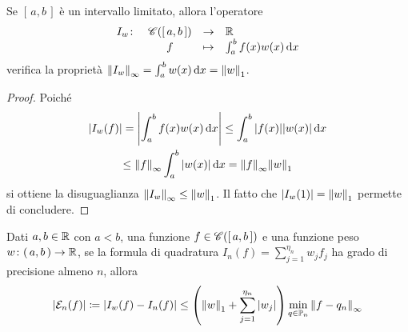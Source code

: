 	\begin{proposizione}\label{prop:norma-integrale}
		Se \([\, a, b \,]\) è un intervallo limitato, allora l'operatore
		\begin{equation*}
			\begin{array}{rccl}
				I_w \colon & \mathscr{C} ([\, a, b \,]) & \to & \mathbb{R} \\
				& f & \mapsto & \int_a^b f (x) w(x) \dd{x}
			\end{array}
		\end{equation*}
		verifica la proprietà \(\norm{I_w}_\infty = \int_a^b w (x) \dd{x} = \norm{w}_1\).
	\end{proposizione}
	
	\begin{proof}
		Poiché
		\begin{multline*}
			\abs{I_w (f)} = \abs{\int_a^b f (x) w (x) \dd{x}} \le \int_a^b \abs{f (x)} \abs{w (x)} \dd{x} \\
			\le \norm{f}_\infty \int_a^b \abs{w (x)} \dd{x} = \norm{f}_\infty \norm{w}_1
		\end{multline*}
		si ottiene la disuguaglianza \(\norm{I_w}_\infty \le \norm{w}_1\). Il fatto che \(\abs{I_w (1)} = \norm{w}_1\) permette di concludere.
	\end{proof}

	\begin{teorema}[Stieltjes]\label{th:stieltjes}
		Dati \(a, b \in \mathbb{R}\) con \(a < b\), una funzione \(f \in \mathscr{C} ([\, a, b \,])\) e una funzione peso \(w \colon (\, a, b \,) \to \mathbb{R}\), se la formula di quadratura \(I_n (f) = \sum_{j = 1}^{\eta_n} w_j f_j\) ha grado di precisione almeno \(n\), allora
		\begin{equation}\label{eq:stieltjes}
			\abs{\mathcal{E}_n (f)} \coloneqq \abs{I_w (f) - I_n (f)} \le \qty(\norm{w}_1 + \sum_{j = 1}^{\eta_n} \abs{w_j}) \min_{q \in \mathbb{P}_n} \norm{f - q_n}_\infty
		\end{equation}
	\end{teorema}

